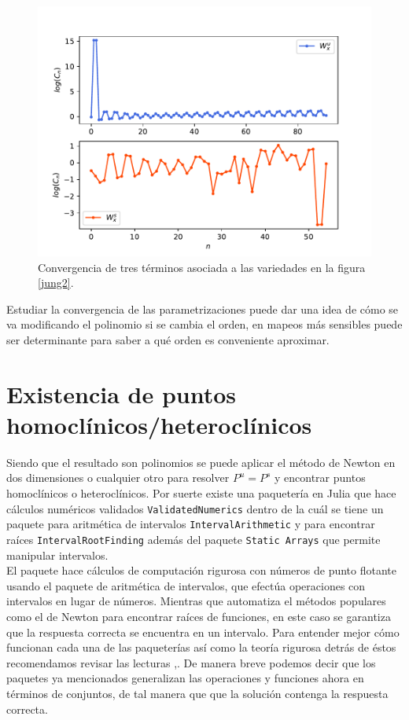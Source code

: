 \begin{figure}[H]
\centering
\includegraphics[scale=0.5]{convergenciaJungT57}
\caption{Convergencia de tres términos asociada a las variedades en la figura \ref{jung2}.}
\label{convergenciaJ3}
\end{figure}

Estudiar la convergencia de las parametrizaciones puede dar una idea de cómo se va modificando el polinomio si se cambia el orden, en mapeos más sensibles puede ser determinante para saber a qué orden es conveniente aproximar. 

\section{Existencia de puntos homoclínicos/heteroclínicos}

Siendo que el resultado son polinomios se puede aplicar el método de Newton en dos dimensiones o cualquier otro para resolver $P^{u}=P^{s}$ y encontrar puntos homoclínicos o heteroclínicos. Por suerte existe una paquetería en Julia que hace cálculos numéricos validados \texttt{ValidatedNumerics}\cite{validated} dentro de la cuál se tiene un paquete para aritmética de intervalos \texttt{IntervalArithmetic}\citep{interval} y para encontrar raíces \texttt{IntervalRootFinding}\cite{root} además del paquete \texttt{Static Arrays}\cite{static} que permite manipular intervalos.\\ 

El paquete \cite{validated} hace cálculos de computación rigurosa con números de punto flotante usando el paquete de aritmética de intervalos, que efectúa operaciones con intervalos en lugar de números. Mientras que \cite{root} automatiza el métodos populares como el de Newton para encontrar raíces de funciones, en este caso se garantiza que la respuesta correcta se encuentra en un intervalo. Para entender mejor cómo funcionan cada una de las paqueterías así como la teoría rigurosa detrás de éstos recomendamos revisar las lecturas \cite{ramon},\cite{Numerics}. De manera breve podemos decir que los paquetes ya mencionados generalizan las operaciones y funciones ahora en términos de conjuntos, de tal manera que que la solución contenga la respuesta correcta. \\


